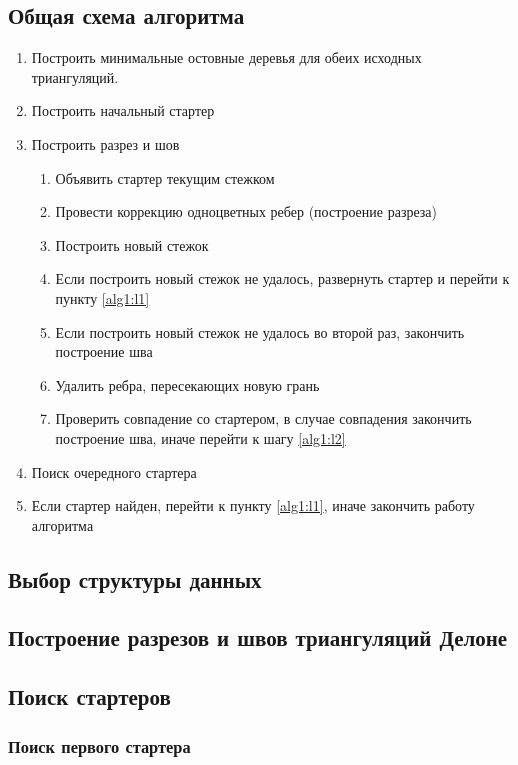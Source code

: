 \documentclass[12pt]{article}
\begin{document}
\subsection{Общая схема алгоритма}
\begin{enumerate}
	\item Построить минимальные остовные деревья для обеих исходных триангуляций.
	\item Построить начальный стартер
	\item \label{alg1:l1} Построить разрез и шов
	\begin{enumerate}
		\item Объявить стартер текущим стежком
		\item Провести коррекцию одноцветных ребер (построение разреза)
		\item \label{alg1:l2} Построить новый стежок
		\item Если построить новый стежок не удалось, развернуть стартер и перейти к пункту \ref{alg1:l1}
		\item Если построить новый стежок не удалось во второй раз, закончить построение шва
		\item Удалить ребра, пересекающих новую грань
		\item Проверить совпадение со стартером, в случае совпадения закончить построение шва, иначе перейти к шагу \ref{alg1:l2}
	\end{enumerate}
	\item Поиск очередного стартера
	\item Если стартер найден, перейти к пункту \ref{alg1:l1}, иначе закончить работу алгоритма
\end{enumerate}

\subsection{Выбор структуры данных}

\subsection{Построение разрезов и швов триангуляций Делоне}

\subsection{Поиск стартеров}

\subsubsection{Поиск первого стартера}
\end{document}
